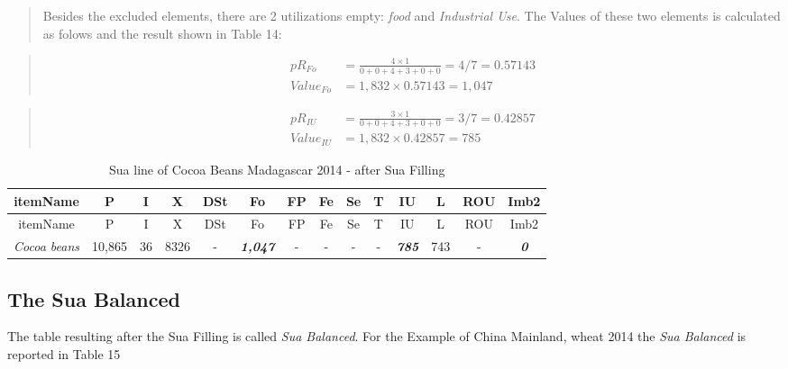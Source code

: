 \documentclass[]{article}
\begin{document}
\begin{quote}
Besides the excluded elements, there are 2 utilizations empty:
\emph{food} and \emph{Industrial Use}. The Values of these two elements
is calculated as folows and the result shown in Table 14:
\end{quote}

\begin{quote}
\begin{equation}
\begin{aligned}
pR_{Fo} &= \frac{4\times 1}{0 + 0 + 4 + 3 + 0 + 0} = 4/7 = 0.57143 \\
Value_{Fo} &= 1,832 \times 0.57143 = 1,047 
\end{aligned}
\end{equation}
\end{quote}

\begin{quote}
\end{quote}

\begin{quote}
\begin{equation}
\begin{aligned}
\label{eq:VIUC}
pR_{IU} &= \frac{3\times 1}{0 + 0 + 4 + 3 + 0 + 0} = 3/7 = 0.42857\\
Value_{IU} &= 1,832 \times 0.42857 = 785
\end{aligned}
\end{equation}
\end{quote}

\begin{longtable}[]{@{}cccccccccccccc@{}}
\caption{Sua line of Cocoa Beans Madagascar 2014 - after Sua
Filling}\tabularnewline
\toprule
itemName & P & I & X & DSt & Fo & FP & Fe & Se & T & IU & L & ROU &
Imb2\tabularnewline
\midrule
\endfirsthead
\toprule
itemName & P & I & X & DSt & Fo & FP & Fe & Se & T & IU & L & ROU &
Imb2\tabularnewline
\midrule
\endhead
\emph{Cocoa beans} & 10,865 & 36 & 8326 & - & \textbf{\emph{1,047}} & -
& - & - & - & \textbf{\emph{785}} & 743 & - &
\textbf{\emph{0}}\tabularnewline
\bottomrule
\end{longtable}

\subsection{The Sua Balanced}\label{the-sua-balanced}

The table resulting after the Sua Filling is called \emph{Sua Balanced}.
For the Example of China Mainland, wheat 2014 the \emph{Sua Balanced} is
reported in Table 15
\end{document}

